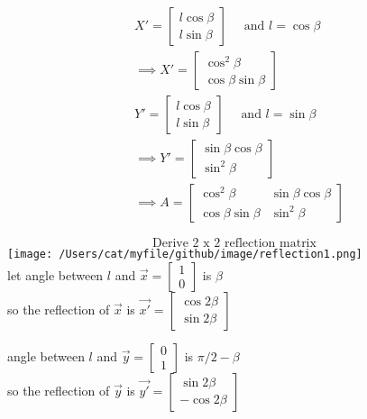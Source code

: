 \documentclass{article}
\begin{document}
\begin{equation}
\begin{aligned}
    & X' =\left[
    \begin{array}{c}
    l\cos\beta\\
    l\sin\beta
    \end{array}
    \right]
    \quad \text{ and }l = \cos\beta\\
    & \implies X' =\left[
    \begin{array}{c}
    \cos^{2}\beta\\
    \cos\beta\sin\beta
    \end{array}
    \right]\\
    & Y' =\left[
    \begin{array}{c}
    l\cos\beta\\
    l\sin\beta
    \end{array}
    \right]
    \quad \text{ and }l = \sin\beta\\
    & \implies Y' =\left[
    \begin{array}{c}
    \sin\beta \cos\beta\\
    \sin^{2}\beta
    \end{array}
    \right]\\
    & \implies A = 
    \begin{bmatrix}
        \cos^{2}\beta & \sin\beta \cos\beta\\
        \cos\beta \sin\beta & \sin^{2}\beta
    \end{bmatrix}
\end{aligned}
\end{equation}

\pagebreak
\[ \text{Derive 2 x 2 reflection matrix}\]
\texttt{[image: /Users/cat/myfile/github/image/reflection1.png]}\\
let angle between $l$ and 
$\vec{x} =\left[
    \begin{array}{c}
    1\\
    0
    \end{array}
    \right]
$
is $\beta$\\
so the reflection of $\vec{x}$
is 
$\vec{x'} =\left[
    \begin{array}{c}
    \cos2\beta\\
    \sin2\beta 
    \end{array}
    \right]
$

angle between $l$ and 
$\vec{y} =\left[
    \begin{array}{c}
    0\\
    1 
    \end{array}
    \right]
$
is $\pi/2 - \beta$\\
so the reflection of $\vec{y}$ is  
$\vec{y'} =\left[
    \begin{array}{c}
    \sin2\beta\\
    -\cos2\beta
    \end{array}
    \right]
$\\
\end{document}

